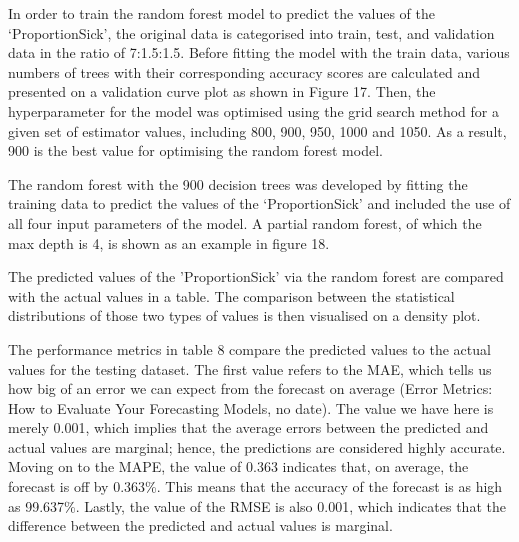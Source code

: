 \documentclass[smallextended]{svjour3}       %
\begin{document}


In order to train the random forest model to predict the values of the ‘ProportionSick’, the original data is categorised into train, test, and validation data in the ratio of 7:1.5:1.5. Before fitting the model with the train data, various numbers of trees with their corresponding accuracy scores are calculated and presented on a validation curve plot as shown in Figure 17. Then, the hyperparameter for the model was optimised using the grid search method for a given set of estimator values, including 800, 900, 950, 1000 and 1050. As a result, 900 is the best value for optimising the random forest model.

The random forest with the 900 decision trees was developed by fitting the training data to predict the values of the ‘ProportionSick’ and included the use of all four input parameters of the model. A partial random forest, of which the max depth is 4, is shown as an example in figure 18.

The predicted values of the 'ProportionSick' via the random forest are compared with the actual values in a table. The comparison between the statistical distributions of those two types of values is then visualised on a density plot.

The performance metrics in table 8 compare the predicted values to the actual values for the testing dataset. The first value refers to the MAE, which tells us how big of an error we can expect from the forecast on average (Error Metrics: How to Evaluate Your Forecasting Models, no date). The value we have here is merely 0.001, which implies that the average errors between the predicted and actual values are marginal; hence, the predictions are considered highly accurate. Moving on to the MAPE, the value of 0.363 indicates that, on average, the forecast is off by 0.363\%. This means that the accuracy of the forecast is as high as 99.637\%. Lastly, the value of the RMSE is also 0.001, which indicates that the difference between the predicted and actual values is marginal.
\end{document}
